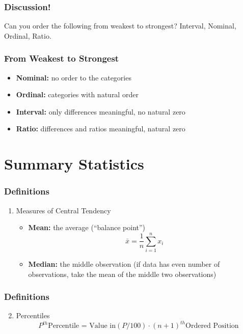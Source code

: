 \documentclass{beamer}
\begin{document}
\begin{frame}
\frametitle{Discussion!}
	Can you order the following from weakest to strongest? 
	\alert{Interval, Nominal, Ordinal, Ratio.}
\end{frame}

\begin{frame}
\frametitle{From Weakest to Strongest}
	\begin{itemize}[<+->]
		\item \textbf{Nominal:} no order to the categories
		\item \textbf{Ordinal:} categories with natural order
		\item \textbf{Interval:} only differences meaningful, no natural zero
		\item \textbf{Ratio:} differences and ratios meaningful, natural zero
	\end{itemize}
\end{frame}

\section{Summary Statistics}
\begin{frame}
\frametitle{Definitions}
	\begin{enumerate}
		\item Measures of Central Tendency
		\begin{itemize}
			\item \textbf{Mean:} the average (``balance point'')
			$$
			\bar{x} = \frac{1}{n} \sum_{i=1}^n x_i
			$$
			\item \textbf{Median:} the middle observation (if data has even number of 							observations, take the mean of the middle two observations)
		\end{itemize}
	\end{enumerate}
\end{frame}

\begin{frame}
\frametitle{Definitions}
	\begin{enumerate}
	\setcounter{enumi}{1}
		\item Percentiles
		$$
		P^{th} \text{Percentile = Value in}  \left(P/100\right)\cdot (n+1)^{th} \text{Ordered 					Position}
		$$
	\end{enumerate}
\end{frame}
\end{document}

